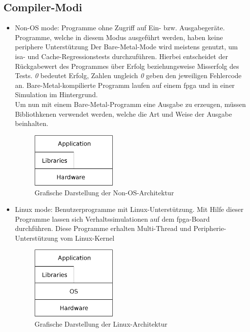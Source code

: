 \subsection{Compiler-Modi}\label{kap:compilermode}
\begin{itemize}
  \item Non-OS mode: Programme ohne Zugriff auf Ein- bzw. Ausgabegeräte. Programme, welche in diesem Modus ausgeführt werden, haben keine periphere Unterstützung
        Der Bare-Metal-Mode wird meistens genutzt, um \ac{isa}- und Cache-Regressionstests durchzuführen. Hierbei entscheidet der Rückgabewert des Programmes über Erfolg beziehungsweise Misserfolg
        des Tests. \emph{0} bedeutet Erfolg, Zahlen ungleich \emph{0} geben den jeweiligen Fehlercode an. Bare-Metal-kompilierte Programm laufen auf einem \ac{fpga} und in einer Simulation
        im Hintergrund. \\
        Um nun mit einem Bare-Metal-Programm eine Ausgabe zu erzeugen, müssen Bibliothkenen verwendet werden, welche die Art und Weise der Ausgabe beinhalten.\\

        \begin{figure}[H]
        \centering
        \includegraphics[width=0.4\textwidth]{Hauptteil/baremetal.eps}
        \caption{Grafische Darstellung der Non-OS-Architektur}\label{fig:baremetal}
        \end{figure}

  \item Linux mode: Benutzerprogramme mit Linux-Unterstützung. Mit Hilfe dieser Programme lassen sich Verhaltssimulationen auf dem \ac{fpga}-Board durchführen. Diese Programme
  erhalten Multi-Thread und Peripherie-Unterstützung vom Linux-Kernel\cite{lowrisc}\\

  \begin{figure}[H]
  \centering
  \includegraphics[width=0.4\textwidth]{Hauptteil/linuxmode.eps}
  \caption{Grafische Darstellung der Linux-Architektur}\label{fig:linuxmode}
  \end{figure}
\end{itemize}





